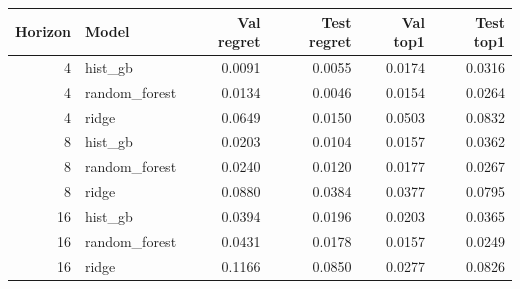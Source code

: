 \begin{tabular}{r l r r r r}
\toprule
Horizon & Model & Val regret & Test regret & Val top1 & Test top1 \\
\midrule
4 & hist\_gb & 0.0091 & 0.0055 & 0.0174 & 0.0316 \\
4 & random\_forest & 0.0134 & 0.0046 & 0.0154 & 0.0264 \\
4 & ridge & 0.0649 & 0.0150 & 0.0503 & 0.0832 \\
8 & hist\_gb & 0.0203 & 0.0104 & 0.0157 & 0.0362 \\
8 & random\_forest & 0.0240 & 0.0120 & 0.0177 & 0.0267 \\
8 & ridge & 0.0880 & 0.0384 & 0.0377 & 0.0795 \\
16 & hist\_gb & 0.0394 & 0.0196 & 0.0203 & 0.0365 \\
16 & random\_forest & 0.0431 & 0.0178 & 0.0157 & 0.0249 \\
16 & ridge & 0.1166 & 0.0850 & 0.0277 & 0.0826 \\
\bottomrule
\end{tabular}
